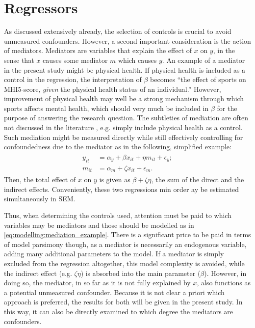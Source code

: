 \section{Regressors}
\label{sec:modelling:regressors}
As discussed extensively already, the selection of controls is crucial to avoid unmeasured confounders. However,
a second important consideration is the action of mediators. Mediators are variables that explain the effect
of $x$ on $y$, in the sense that $x$ causes some mediator $m$ which causes $y$. An example of a mediator in the present
study might be physical health. If physical health is included as a control in the regression, the interpretation of $\beta$
becomes ``the effect of sports on MHI5-score, \textit{given} the physical health status of an individual.'' However,
improvement of physical health may well be a strong mechanism through which sports affects mental health, which
should very much be included in $\beta$ for the purpose of answering the research question. The subtleties of mediation
are often not discussed in the literature \cite{imbens2024causal}, e.g.  simply include physical health as a control.
Such mediation might be measured directly while still effectively controlling for confoundedness due to the mediator as
in the following, simplified example:
\begin{align}
\begin{split}
    \label{eq:modelling:mediation_example}
    y_{it} &= \alpha_y + \beta x_{it} + \eta m_{it} + \epsilon_y; \\
    m_{it} &= \alpha_m + \zeta x_{it} + \epsilon_m.
\end{split}
\end{align}
Then, the total effect of $x$ on $y$ is given as $\beta + \zeta \eta$, the sum of the direct and the indirect effects.
Conveniently, these two regressions min order ay be estimated simultaneously in SEM.

Thus, when determining the controls used, attention must be paid to which variables may be mediators and those should be
modelled as in \cref{eq:modelling:mediation_example}. There is a significant price to be paid in terms of model parsimony
though, as a mediator is necessarily an endogenous variable, adding many additional parameters to the model.
If a mediator is simply excluded from the regression altogether, this model complexity is avoided, while the indirect
effect (e.g. $\zeta \eta$) is absorbed into the main parameter ($\beta$). However, in doing so, the mediator, in so far
as it is not fully explained by $x$, also functions as a potential unmeasured confounder.
Because it is not clear a priori which approach is preferred, the results for both will be given in the present study.
In this way, it can also be directly examined to which degree the mediators are confounders.

